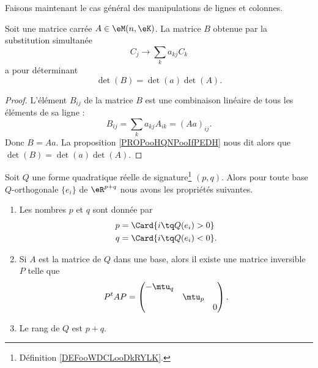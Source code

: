 Faisons maintenant le cas général des manipulations de lignes et colonnes.

\begin{proposition}     \label{PROPooSLLGooSZjQrv}
    Soit une matrice carrée \( A\in \eM(n,\eK)\). La matrice \( B\) obtenue par la substitution simultanée
    \begin{equation}
        C_j\to \sum_ka_{kj}C_k
    \end{equation}
    a pour déterminant
    \begin{equation}
        \det(B)=\det(a)\det(A).
    \end{equation}
\end{proposition}

\begin{proof}
    L'élément \( B_{ij}\) de la matrice \( B\) est une combinaison linéaire de tous les éléments de sa ligne :
    \begin{equation}
        B_{ij}=\sum_ka_{kj}A_{ik}=(Aa)_{ij}.
    \end{equation}
    Donc \( B=Aa\). La proposition \ref{PROPooHQNPooIfPEDH} nous dit alors que \( \det(B)=\det(a)\det(A)\).
\end{proof}

\begin{theorem}   \label{ThoQFVsBCk}
    Soit $Q$ une forme quadratique réelle de signature\footnote{Définition \ref{DEFooWDCLooDkRYLK}.} \( (p,q)\). Alors pour toute base \( Q\)-orthogonale \( \{ e_i \}\) de \( \eR^{p+q}\) nous avons les propriétés suivantes.
    \begin{enumerate}
        \item       \label{ITEMooCFQHooRWfmpT}
            Les nombres \( p\) et \( q\) sont donnée par 
    \begin{subequations}
        \begin{align}
            p&=\Card\{ i\tq Q(e_i)>0 \}             \label{SUBEQooONWLooNsgmQY}   \\
            q&=\Card\{ i\tq Q(e_i)<0 \}.        \label{SUBEQooFKXMooOVwvKR}
        \end{align}
    \end{subequations}
\item       \label{ITEMooWLPVooSTOOjL}
    Si \( A\) est la matrice de \( Q\) dans une base, alors il existe une matrice inversible \( P\) telle que
    \begin{equation}
        P^tAP=\begin{pmatrix}
            -\mtu_q    &       &       \\
                &   \mtu_p    &       \\
                &       &   0
        \end{pmatrix}.
    \end{equation}
\item       \label{ITEMooGOHCooPrNQwm}
    Le rang de \( Q\) est \( p+q\).
    \end{enumerate}
\end{theorem}


